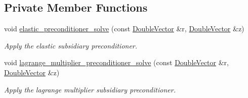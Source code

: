\subsection*{Private Member Functions}
\begin{DoxyCompactItemize}
\item 
void \hyperlink{classoomph_1_1PseudoElasticPreconditionerOld_a5255c2de35cb38cd49e71220e96db22c}{elastic\+\_\+preconditioner\+\_\+solve} (const \hyperlink{classoomph_1_1DoubleVector}{Double\+Vector} \&r, \hyperlink{classoomph_1_1DoubleVector}{Double\+Vector} \&z)
\begin{DoxyCompactList}\small\item\em Apply the elastic subsidiary preconditioner. \end{DoxyCompactList}\item 
void \hyperlink{classoomph_1_1PseudoElasticPreconditionerOld_a02d8d2a2ad34030238f7f65964f91a08}{lagrange\+\_\+multiplier\+\_\+preconditioner\+\_\+solve} (const \hyperlink{classoomph_1_1DoubleVector}{Double\+Vector} \&r, \hyperlink{classoomph_1_1DoubleVector}{Double\+Vector} \&z)
\begin{DoxyCompactList}\small\item\em Apply the lagrange multiplier subsidiary preconditioner. \end{DoxyCompactList}\end{DoxyCompactItemize}
